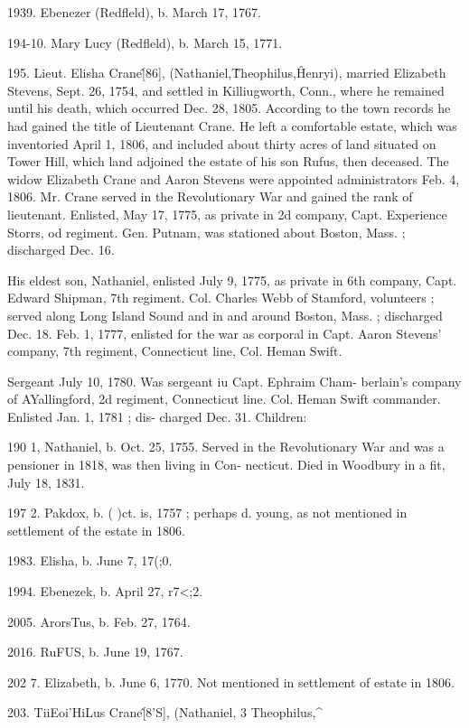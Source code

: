 \documentclass{book}
\begin{document}
1939. Ebenezer (Redfleld), b. March 17, 1767. 

194-10. Mary Lucy (Redfleld), b. March 15, 1771. 

195. Lieut. Elisha Crane\^ [86], (Nathaniel,\^ Theophilus,\^ 
Henryi), married Elizabeth Stevens, Sept. 26, 1754, and settled 
in Killiugworth, Conn., where he remained until his death, which 
occurred Dec. 28, 1805. According to the town records he had 
gained the title of Lieutenant Crane. He left a comfortable 
estate, which was inventoried April 1, 1806, and included about 
thirty acres of land situated on Tower Hill, which land adjoined 
the estate of his son Rufus, then deceased. The widow Elizabeth 
Crane and Aaron Stevens were appointed administrators Feb. 4, 
1806. Mr. Crane served in the Revolutionary War and gained 
the rank of lieutenant. Enlisted, May 17, 1775, as private in 2d 
company, Capt. Experience Storrs, od regiment. Gen. Putnam, 
was stationed about Boston, Mass. ; discharged Dec. 16. 

His eldest son, Nathaniel, enlisted July 9, 1775, as private in 
6th company, Capt. Edward Shipman, 7th regiment. Col. Charles 
Webb of Stamford, volunteers ; served along Long Island Sound 
and in and around Boston, Mass. ; discharged Dec. 18. Feb. 1, 
1777, enlisted for the war as corporal in Capt. Aaron Stevens' 
company, 7th regiment, Connecticut line, Col. Heman Swift. 




Sergeant July 10, 1780. Was sergeant iu Capt. Ephraim Cham- 
berlain's company of AYallingford, 2d regiment, Connecticut line. 
Col. Heman Swift commander. Enlisted Jan. 1, 1781 ; dis- 
charged Dec. 31. Children: 

190  1, Nathaniel, b. Oct. 25, 1755. Served in the Revolutionary 
War and was a pensioner in 1818, was then living in Con- 
necticut. Died in Woodbury in a fit, July 18, 1831. 

197  2. Pakdox, b. ( )ct. is, 1757 ; perhaps d. young, as not mentioned 
in settlement of the estate in 1806. 

1983. Elisha, b. June 7, 17(;0. 

1994. Ebenezek, b. April 27, r7<;2. 

2005. ArorsTus, b. Feb. 27, 1764. 

2016. RuFUS, b. June 19, 1767. 

202  7. Elizabeth, b. June 6, 1770. Not mentioned in settlement of 
estate in 1806. 

203. TiiEoi'HiLus Crane\^ [8'S], (Nathaniel, 3 Theophilus,\^ 
\end{document}
